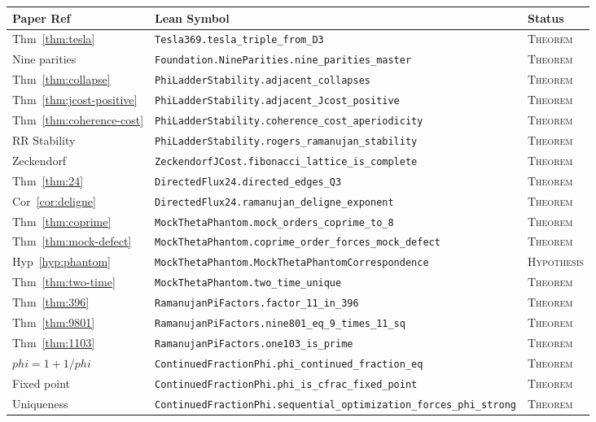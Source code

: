 \documentclass[11pt]{article}
\def\phig{phi}
\theoremstyle{plain}
\theoremstyle{definition}
\theoremstyle{remark}
\newcommand{\phig}{\varphi}
\begin{document}
\begin{center}
\small
\begin{tabular}{@{}lll@{}}
\toprule
\textbf{Paper Ref} & \textbf{Lean Symbol} & \textbf{Status} \\
\midrule
Thm~\ref{thm:tesla}
  & \texttt{Tesla369.tesla\_triple\_from\_D3}
  & \textsc{Theorem} \\
Nine parities
  & \texttt{Foundation.NineParities.nine\_parities\_master}
  & \textsc{Theorem} \\
\midrule
Thm~\ref{thm:collapse}
  & \texttt{PhiLadderStability.adjacent\_collapses}
  & \textsc{Theorem} \\
Thm~\ref{thm:jcost-positive}
  & \texttt{PhiLadderStability.adjacent\_Jcost\_positive}
  & \textsc{Theorem} \\
Thm~\ref{thm:coherence-cost}
  & \texttt{PhiLadderStability.coherence\_cost\_aperiodicity}
  & \textsc{Theorem} \\
RR Stability
  & \texttt{PhiLadderStability.rogers\_ramanujan\_stability}
  & \textsc{Theorem} \\
Zeckendorf
  & \texttt{ZeckendorfJCost.fibonacci\_lattice\_is\_complete}
  & \textsc{Theorem} \\
\midrule
Thm~\ref{thm:24}
  & \texttt{DirectedFlux24.directed\_edges\_Q3}
  & \textsc{Theorem} \\
Cor~\ref{cor:deligne}
  & \texttt{DirectedFlux24.ramanujan\_deligne\_exponent}
  & \textsc{Theorem} \\
\midrule
Thm~\ref{thm:coprime}
  & \texttt{MockThetaPhantom.mock\_orders\_coprime\_to\_8}
  & \textsc{Theorem} \\
Thm~\ref{thm:mock-defect}
  & \texttt{MockThetaPhantom.coprime\_order\_forces\_mock\_defect}
  & \textsc{Theorem} \\
Hyp~\ref{hyp:phantom}
  & \texttt{MockThetaPhantom.MockThetaPhantomCorrespondence}
  & \textsc{Hypothesis} \\
Thm~\ref{thm:two-time}
  & \texttt{MockThetaPhantom.two\_time\_unique}
  & \textsc{Theorem} \\
\midrule
Thm~\ref{thm:396}
  & \texttt{RamanujanPiFactors.factor\_11\_in\_396}
  & \textsc{Theorem} \\
Thm~\ref{thm:9801}
  & \texttt{RamanujanPiFactors.nine801\_eq\_9\_times\_11\_sq}
  & \textsc{Theorem} \\
Thm~\ref{thm:1103}
  & \texttt{RamanujanPiFactors.one103\_is\_prime}
  & \textsc{Theorem} \\
\midrule
$\phig = 1 + 1/\phig$
  & \texttt{ContinuedFractionPhi.phi\_continued\_fraction\_eq}
  & \textsc{Theorem} \\
Fixed point
  & \texttt{ContinuedFractionPhi.phi\_is\_cfrac\_fixed\_point}
  & \textsc{Theorem} \\
Uniqueness
  & \texttt{ContinuedFractionPhi.sequential\_optimization\_forces\_phi\_strong}
  & \textsc{Theorem} \\
\bottomrule
\end{tabular}
\end{center}
\end{document}
